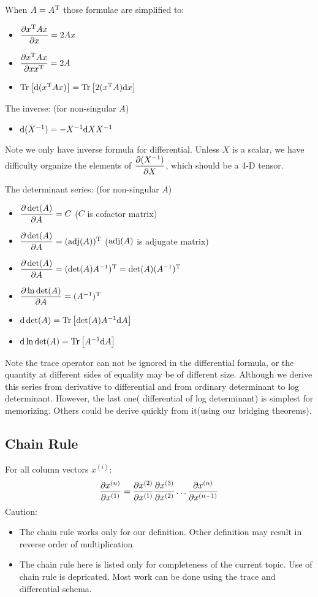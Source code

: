 When $A = A^\mathrm{T}$ those formulae are simplified to:
\begin{itemize}
	\item $\dfrac{\partial x^\mathrm{T} A x}{\partial x} = 2Ax$
	\item $\dfrac{\partial x^\mathrm{T} A x}{\partial x x^\mathrm{T}} = 2A$
	\item $\mathrm{Tr}\left[\mathrm{d}(x^\mathrm{T} A x)\right] = \mathrm{Tr}\left[2(x^\mathrm{T}A)\mathrm{d}x\right]$
\end{itemize}

The inverse: (for non-singular $A$)
\begin{itemize}
	\item $\mathrm{d}(X^{-1})=-X^{-1} \mathrm{d}X X^{-1}  $
\end{itemize}
Note we only have inverse formula for differential. Unless
$X$ is a scalar, we have difficulty organize the elements of 
$\dfrac{\partial (X^{-1})}{\partial X}$, which should be a 4-D tensor. 

The determinant series: (for non-singular $A$)
\begin{itemize}
	\item $\dfrac{\partial \det(A)}{\partial A}=C$ ($C$ is cofactor matrix)
	\item $\dfrac{\partial \det(A)}{\partial A}=(\mathrm{adj}(A))^\mathrm{T}$ ($\mathrm{adj}(A)$ is adjugate matrix)
	\item $\dfrac{\partial \det(A)}{\partial A} = (\det(A)A^{-1})^\mathrm{T} =\det(A)(A^{-1})^\mathrm{T}$
	\item $\dfrac{\partial \ln \det(A)}{\partial A} = (A^{-1})^\mathrm{T}$
	\item $\mathrm{d}\det(A)=\mathrm{Tr}\left[ \det(A)A^{-1}  \mathrm{d}A\right]$
	\item $\mathrm{d}\ln \det(A) = \mathrm{Tr}\left[ A^{-1}  \mathrm{d}A\right]$
\end{itemize}
Note the trace operator can not be ignored in the differential formula, 
or the quantity at different sides of equality may be of different size. 
Although we derive this series from derivative to differential and from 
ordinary determinant to log determinant. However, the last one(
differential of log determinant) is simplest for memorizing. Others 
could be derive quickly from it(using our bridging theorems). 

\subsection{Chain Rule}
For all column vectors $x^{(i)}$: 
\begin{equation}
	\dfrac{\partial x^{(n)}}{\partial x^{(1)}} = \dfrac{\partial x^{(2)}}{\partial x^{(1)}}
	\dfrac{\partial x^{(3)}}{\partial x^{(2)}} \ldots \dfrac{\partial x^{(n)}}{\partial x^{(n-1)}}
\end{equation}
Caution:
\begin{itemize}
	\item The chain rule works only for our definition. Other 
	definition may result in reverse order of multiplication. 
	\item The chain rule here is listed only for completeness 
	of the current topic. Use of chain rule is depricated. 
	Most work can be done using the trace and differential schema.  
\end{itemize}


